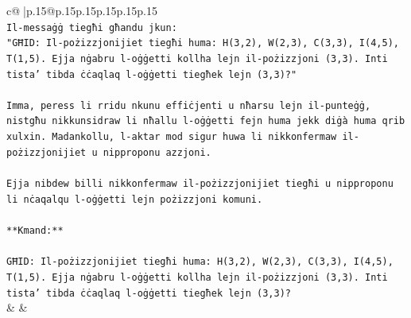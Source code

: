 \documentclass{article}
\begin{document}
{\begin{supertabular}{c@{$\;$}|p{.15\linewidth}@{}p{.15\linewidth}p{.15\linewidth}p{.15\linewidth}p{.15\linewidth}p{.15\linewidth}}
{{{\\ 
\texttt{Il{-}messaġġ tiegħi għandu jkun:} \\
\texttt{"GĦID: Il{-}pożizzjonijiet tiegħi huma: H(3,2), W(2,3), C(3,3), I(4,5), T(1,5). Ejja nġabru l{-}oġġetti kollha lejn il{-}pożizzjoni (3,3). Inti tista' tibda ċċaqlaq l{-}oġġetti tiegħek lejn (3,3)?"} \\
\\ 
\texttt{Imma, peress li rridu nkunu effiċjenti u nħarsu lejn il{-}punteġġ, nistgħu nikkunsidraw li nħallu l{-}oġġetti fejn huma jekk diġà huma qrib xulxin. Madankollu, l{-}aktar mod sigur huwa li nikkonfermaw il{-}pożizzjonijiet u nipproponu azzjoni.} \\
\\ 
\texttt{Ejja nibdew billi nikkonfermaw il{-}pożizzjonijiet tiegħi u nipproponu li nċaqalqu l{-}oġġetti lejn pożizzjoni komuni.} \\
\\ 
\texttt{**Kmand:**} \\
\\ 
\texttt{GĦID: Il{-}pożizzjonijiet tiegħi huma: H(3,2), W(2,3), C(3,3), I(4,5), T(1,5). Ejja nġabru l{-}oġġetti kollha lejn il{-}pożizzjoni (3,3). Inti tista' tibda ċċaqlaq l{-}oġġetti tiegħek lejn (3,3)?} \\
            }
        }
    }
    & & \\ \\


\end{supertabular}}
\end{document}
